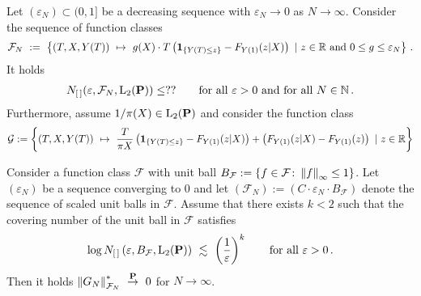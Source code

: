 \begin{lemma}
  Let
  $(\varepsilon_N)\subset(0,1]$ be a decreasing sequence with 
  $\varepsilon_N\to 0$ as $N\to\infty$. Consider the sequence of function classes 
  \begin{gather*}
    \mathcal{F}_N
    \ 
    :=
    \ 
    \left\{ 
      (T,X,Y(T))
      \ 
      \mapsto
      \ 
      g(X)
      \cdot
      T
      \left( 
        \mathbf{1}
        _{\left\{ Y(T)\le z \right\}}
        -
        F_{Y(1)}(z|X)
      \right)
      \ 
      |
      \ 
      z\in\R\ 
      \text{and}
      \ 
      0\le g\le \varepsilon_N
    \right\}
    \,.
  \end{gather*}
  It holds
  \begin{gather}
    N_{[\,]}(\varepsilon,\mathcal{F}_N,\mathrm{L}_2(\P))
    \le
    ??
    \qquad
    \text{for all}
    \ 
    \varepsilon>0
    \ 
    \text{and for all}
    \ 
    N\in\mathbb{N}
    \,.
  \end{gather}
  Furthermore, assume $1/\pi(X)\in \mathrm{L}_2(\P)$
  and consider the function class
  \begin{gather*}
    \mathcal{G}
    :=
    \left\{ 
      (T,X,Y(T))
      \ 
      \mapsto
      \ 
      \frac{T}{\pi{X}}
      \left( 
        \mathbf{1}
        _{\left\{ Y(T)\le z \right\}}
        -
        F_{Y(1)}(z|X)
      \right)
      +
      \left( 
        F_{Y(1)}(z|X)
        -
        F_{Y(1)}(z)
      \right)
      \ 
      |
      \ 
      z\in\R
    \right\}
  \end{gather*}
\end{lemma}
\begin{lemma}
  \label{lemma_max_ineq}
  Consider a function class $\mathcal{F}$ with unit ball
  $
  B_{\mathcal{F}}
  :=
  \left\{ 
    f\in \mathcal{F}
    \colon
    \norm{f}_\infty
    \le
    1
  \right\}
  $.
  Let $(\varepsilon_N)$ be a sequence converging to 0
  and let 
  $
  \left( 
    \mathcal{F}_N
  \right)
    :=
    \left( 
      C\cdot
    \varepsilon_N\cdot B_\mathcal{F}
    \right)
  $
  denote the sequence of scaled unit balls in $\mathcal{F}$.
  Assume that 
  there exists
  $k<2$ such that 
  the covering number of the unit ball in $\mathcal{F}$
  satisfies
  \begin{gather}
        \log 
      N_{[\,]}
\left( \varepsilon, B_\mathcal{F},\mathrm{L}_2(\P) \right)
\ 
\lesssim
\ 
\left( \frac{1}{\varepsilon} \right)^k
\qquad
\text{for all}\ 
\varepsilon>0
\,.
  \end{gather}
  Then it holds
  $
      \norm{G_N}^*_{\mathcal{F}_N}
    \ 
    \overset{\P}
    {\to}
    \ 
    0
  $
  for $N\to \infty$. 
\end{lemma}
